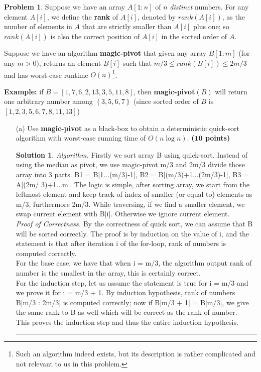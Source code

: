 \documentclass{article}
\theoremstyle{definition}
\newtheorem{problem}{Problem}
\def\fline{\rule{0.75\linewidth}{0.5pt}}
\newcommand{\finishline}{\begin{center}\fline\end{center}}
\newtheorem*{solution*}{Solution}
\newenvironment{solution}{\begin{solution*}}{{\finishline} \end{solution*}}
\newcommand{\grade}[1]{\hfill{\textbf{($\mathbf{#1}$ points)}}}
\newcommand{\set}[1]{\ensuremath{\left\{ #1 \right\}}}
\begin{document}
\begin{problem}
	Suppose we have an array $A[1:n]$ of $n$ \emph{distinct} numbers. For any element $A[i]$, we define the \textbf{rank} of $A[i]$, denoted by $rank(A[i])$, as the number of elements in $A$ that are strictly smaller than $A[i]$ plus one; so $rank(A[i])$ 
	is also the correct position of $A[i]$ in the sorted order of $A$. 
	
	Suppose we have an algorithm \textbf{magic-pivot} that given any array $B[1:m]$ (for any $m > 0$), returns an element $B[i]$ such that $m/3 \leq rank(B[i]) \leq 2m/3$ and has worst-case runtime $O(n)$\footnote{Such an algorithm indeed
	exists, but its description is rather complicated and not relevant to us in this problem.}. 

	\textbf{Example:} if $B=[1,7,6,2,13,3,5,11,8]$, then \textbf{magic-pivot}$(B)$ will return one arbitrary number among $\set{3,5,6,7}$ (since sorted order of $B$ is $[1,2,3,5,6,7,8,11,13]$)
	
	\begin{enumerate}
	\item[(a)] Use \textbf{magic-pivot} as a black-box to obtain a {deterministic} quick-sort algorithm with worst-case running time of $O(n\log{n})$. \grade{10}
	
	\begin{solution}
	
		\emph{Algorithm.} Firstly we sort array B using quick-sort. Instead of using the median as pivot, we use magic-pivot m/3 and 2m/3 divide those array into 3 parts. B1 = B[1...(m/3)-1], B2 = B[(m/3)+1...(2m/3)-1], B3 = A[(2m/	3)+1...m]. The logic is simple, after sorting array, we start from the leftmost element and keep track of index of smaller (or equal to) elements as m/3, furthermore 2m/3. While traversing, if we find a smaller element, we swap current element with B[i]. Otherwise we ignore current element.  \\
		
		\emph{Proof of Correctness.} By the correctness of quick sort, we can assume that B will be sorted correctly. The proof is by induction on the value of i, and the statement is that after iteration i of the for-loop, rank of numbers is computed correctly. \\
For the base case, we have that when i = m/3, the algorithm output rank of number is the smallest in the array, this is certainly correct. \\
For the induction step, let us assume the statement is true for i = m/3 and we prove it for i = m/3 + 1. By induction hypothesis, rank of numbers B[m/3 : 2m/3] is computed correctly; now if B[m/3 + 1] = B[m/3], we give the same rank to B as well which will be correct as the rank of number.  \\
This proves the induction step and thus the entire induction hypothesis. \\
			

\end{solution}
\end{enumerate}
\end{problem}
\end{document}
